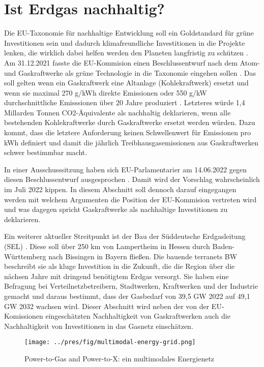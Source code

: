 
\section{Ist Erdgas nachhaltig?}

Die EU-Taxonomie für nachhaltige Entwicklung soll ein Goldstandard für grüne Investitionen sein und dadurch klimafreundliche Investitionen in die Projekte lenken, die wirklich dabei helfen werden den Planeten langfristig zu schützen \cite{reuters}. Am 31.12.2021 fasste die EU-Kommision einen Beschlussentwurf nach dem Atom- und Gaskraftwerke als grüne Technologie in die Taxonomie eingehen sollen \cite{taz-taxonomie}. Das soll gelten wenn ein Gaskraftwerk eine Altanlage (Kohlekraftwerk) ersetzt \cite{eu-komm} und wenn sie maximal 270 g/kWh direkte Emissionen oder 550 g/kW durchschnittliche Emisssionen über 20 Jahre produziert \cite{uba}. Letzteres würde 1,4 Millarden Tonnen CO2-Äquivalente als nachhaltig deklarieren, wenn alle bestehenden Kohlekraftwerke durch Gaskraftwerke ersetzt werden würden. Dazu kommt, dass die letztere Anforderung keinen Schwellenwert für Emissionen pro kWh definiert und damit die jährlich Treibhausgasemissionen aus Gaskraftwerken schwer bestimmbar macht.

In einer Ausschusssitzung haben sich EU-Parlamentarier am 14.06.2022 gegen diesen Beschlussentwurf ausgesprochen \cite{spiegel-taxonomie}. Damit wird der Vorschlag wahrscheinlich im Juli 2022 kippen. In diesem Abschnitt soll dennoch darauf eingegangen werden mit welchem Argumenten die Position der EU-Kommision vertreten wird und was dagegen spricht Gaskraftwerke als nachhaltige Investitionen zu deklarieren. 

Ein weiterer aktueller Streitpunkt ist der Bau der Süddeutsche Erdgasleitung (SEL) \cite{terranets}. Diese soll über 250 km von Lampertheim in Hessen durch Baden-Württemberg nach Bissingen in Bayern fließen. Die bauende terranets BW beschreibt sie als kluge Investition in die Zukunft, die die Region über die nächsen Jahre mit dringend benötigtem Erdgas versorgt. Sie haben eine Befragung bei Verteilnetzbetreibern, Stadtwerken, Kraftwerken und der Industrie gemacht und daraus bestimmt, dass der Gasbedarf von 39,5 GW 2022 auf 49,1 GW 2032 wachsen wird.
Dieser Abschnitt wird neben der von der EU-Komissionen eingeschätzten Nachhaltigkeit von Gaskraftwerken auch die Nachhaltigkeit von Investitionen in das Gasnetz einschätzen.

\begin{figure}
\centering
\texttt{[image: ../pres/fig/multimodal-energy-grid.png]}
\caption{Power-to-Gas and Power-to-X: ein multimodales Energienetz \cite{multimodal-grids}}
\label{fig:multimodal-grids}
\end{figure}

